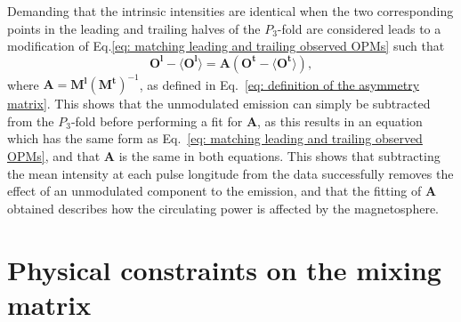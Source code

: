 Demanding that the intrinsic intensities are identical when the two corresponding points in the leading and trailing halves of the $P_3$-fold are considered leads to a modification of Eq.\eqref{eq: matching leading and trailing observed OPMs} such that
\begin{equation}
    \label{eq: matching leading and trailing observed OPMs with background term}
    \mathbf{O^l}-\langle\mathbf{O^l}\rangle = \mathbf{A}(\mathbf{O^t} - \langle\mathbf{O^t}\rangle),
\end{equation}
where $\mathbf{A} = \mathbf{M^l}(\mathbf{M^t})^{-1}$, as defined in Eq.~\eqref{eq: definition of the asymmetry matrix}. This shows that the unmodulated emission can simply be subtracted from the $P_3$-fold before performing a fit for $\mathbf{A}$, as this results in an equation which has the same form as Eq.~\eqref{eq: matching leading and trailing observed OPMs}, and that $\mathbf{A}$ is the same in both equations. This shows that subtracting the mean intensity at each pulse longitude from the data successfully removes the effect of an unmodulated component to the emission, and that the fitting of $\mathbf{A}$ obtained describes how the circulating power is affected by the magnetosphere.


\section{Physical constraints on the mixing matrix}
\label{app: B0031temp - physical constraints}

